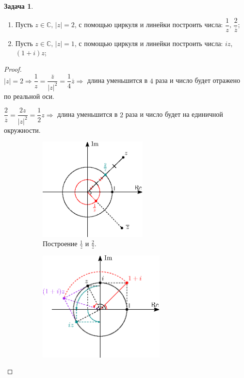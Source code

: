 \documentclass[12pt]{article}
\newcommand{\MC}{\mathbb{C}}
\theoremstyle{definition}
\newtheorem{problem}{Задача}
\newcommand{\ovl}[1]{\overline{#1}}
\begin{document}
\begin{problem}\hfill	
	\begin{enumerate}[label=\alph*)]
		\item Пусть $z \in \MC, \, |z| = 2$, с помощью циркуля и линейки построить числа: $\dfrac{1}{z},\,  \dfrac{2}{\ovl{z}}$;
		\item Пусть $z \in \MC, \, |z| = 1$, с помощью циркуля и линейки построить числа: $iz$, $(1 + i)z$;
	\end{enumerate}
\end{problem}
\begin{proof}\hfill\\
	$|z| = 2 \Rightarrow \dfrac{1}{z} = \dfrac{\ovl{z}}{|z|^2} = \dfrac{1}{4}\ovl{z} \Rightarrow$ длина уменьшится в $4$ раза и число будет отражено по реальной оси.
	
	$\dfrac{2}{\ovl{z}} = \dfrac{2z}{|z|^2} = \dfrac{1}{2}z \Rightarrow $ длина уменьшится в $2$ раза и число будет на единичной окружности.
	\begin{figure}[H]
		\begin{subfigure}{.5\textwidth}
			\centering
			\includegraphics[width=0.6\textwidth]{AL1S3_3.eps}
			\caption{Построение $\tfrac{1}{z}$ и $\tfrac{2}{\ovl{z}}$.}
			\label{AL1S3_3}
		\end{subfigure}
		\begin{subfigure}{.5\textwidth}
			\centering
			\includegraphics[width=0.7\textwidth]{AL1S3_4.eps}

\end{subfigure}
\end{figure}
\end{proof}
\end{document}
